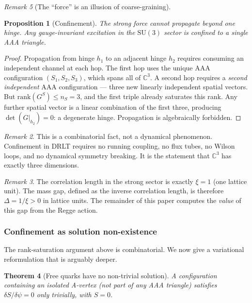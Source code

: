 \documentclass[12pt]{article}
\newtheorem{theorem}{Theorem}[section]
\newtheorem{proposition}[theorem]{Proposition}
\theoremstyle{remark}
\newtheorem{remark}[theorem]{Remark}
\theoremstyle{definition}
\newcommand{\CC}{\mathbb{C}}
\begin{document}
\begin{remark}[The ``force'' is an illusion of coarse-graining]
\begin{proposition}[Confinement]
\label{prop:confinement}
The strong force cannot propagate beyond one hinge. Any gauge-invariant
excitation in the $\mathrm{SU}(3)$ sector is confined to a single AAA
triangle.
\end{proposition}

\begin{proof}
Propagation from hinge $h_1$ to an adjacent hinge $h_2$ requires
consuming an independent channel at each hop. The first hop uses the
unique AAA configuration $(S_1, S_2, S_3)$, which spans all of
$\CC^3$. A second hop requires a \emph{second independent} AAA
configuration --- three new linearly independent spatial vectors. But
$\mathrm{rank}(G^S) \leq n_S = 3$, and the first triple already
saturates this rank. Any further spatial vector is a linear combination
of the first three, producing $\det(G|_{h_2}) = 0$: a degenerate hinge.
Propagation is algebraically forbidden.
\end{proof}

\begin{remark}
This is a combinatorial fact, not a dynamical phenomenon. Confinement
in DRLT requires no running coupling, no flux tubes, no Wilson loops,
and no dynamical symmetry breaking. It is the statement that
$\CC^3$ has exactly three dimensions.
\end{remark}

\begin{remark}
The correlation length in the strong sector is exactly $\xi = 1$ (one
lattice unit). The mass gap, defined as the inverse correlation length,
is therefore $\Delta = 1/\xi > 0$ in lattice units. The remainder of
this paper computes the \emph{value} of this gap from the Regge action.
\end{remark}

\subsubsection{Confinement as solution non-existence}
\label{sec:confinement_solution}

The rank-saturation argument above is combinatorial.  We now give a variational reformulation that is arguably deeper.

\begin{theorem}[Free quarks have no non-trivial solution]
\label{thm:confinement_variational}
A configuration containing an isolated A-vertex (not part of any AAA triangle) satisfies $\delta S/\delta\psi = 0$ only trivially, with $S = 0$.
\end{theorem}


\end{remark}
\end{document}
